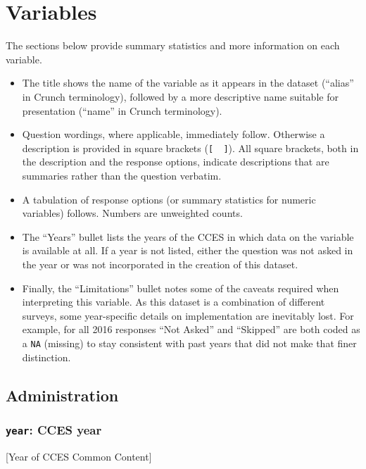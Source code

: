 \documentclass[10pt,article,oneside]{memoir}
\theoremstyle{definition}
\begin{document}
\section{Variables}\label{variables}

The sections below provide summary statistics and more information on
each variable.

\begin{itemize}
\tightlist
\item
  The title shows the name of the variable as it appears in the dataset
  (``alias'' in Crunch terminology), followed by a more descriptive name
  suitable for presentation (``name'' in Crunch terminology).
\item
  Question wordings, where applicable, immediately follow. Otherwise a
  description is provided in square brackets (\texttt{{[}\ \ {]}}). All
  square brackets, both in the description and the response options,
  indicate descriptions that are summaries rather than the question
  verbatim.
\item
  A tabulation of response options (or summary statistics for numeric
  variables) follows. Numbers are unweighted counts.
\item
  The ``Years'' bullet lists the years of the CCES in which data on the
  variable is available at all. If a year is not listed, either the
  question was not asked in the year or was not incorporated in the
  creation of this dataset.
\item
  Finally, the ``Limitations'' bullet notes some of the caveats required
  when interpreting this variable. As this dataset is a combination of
  different surveys, some year-specific details on implementation are
  inevitably lost. For example, for all 2016 responses ``Not Asked'' and
  ``Skipped'' are both coded as a \texttt{NA} (missing) to stay
  consistent with past years that did not make that finer distinction.
\end{itemize}

\subsection{Administration}\label{administration}

\subsubsection{\texorpdfstring{\texttt{year}: CCES
year}{year: CCES year}}\label{year-cces-year}

{[}Year of CCES Common Content{]}
\end{document}
